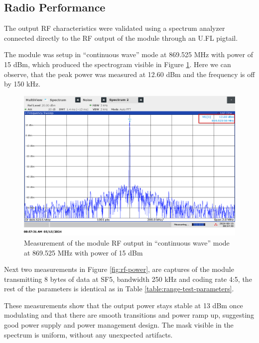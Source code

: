 \subsection{Radio Performance}
The output RF characteristics were validated using a spectrum analyzer connected directly to the RF output of the module through an U.FL pigtail.

The module was setup in ``continuous wave'' mode at 869.525 MHz with power of 15 dBm, which produced the spectrogram visible in Figure \ref{fig:rf-mask-wave}. Here we can observe, that the peak power was measured at 12.60 dBm and the frequency is off by 150 kHz.

\begin{figure}
    \includegraphics[width=.9\textwidth]{fig/rf-mask-wave.png}
    \caption{\label{fig:rf-mask-wave}Measurement of the module RF output in ``continuous wave'' mode at 869.525 MHz with power of 15 dBm}
\end{figure}

Next two measurements in Figure \ref{fig:rf-power}, are captures of the module transmitting 8 bytes of data at SF5, bandwidth 250 kHz and coding rate 4:5, the rest of the parameters is identical as in Table \ref{table:range-test-parameters}. 

These measurements show that the output power stays stable at 13 dBm once modulating and that there are smooth transitions and power ramp up, suggesting good power supply and power management design. The mask visible in the spectrum is uniform, without any unexpected artifacts.

